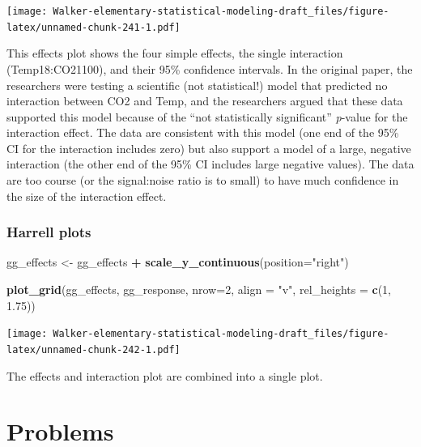 \documentclass[]{book}
\newenvironment{Shaded}{\begin{snugshade}}{\end{snugshade}}
\newcommand{\DataTypeTok}[1]{\textcolor[rgb]{0.13,0.29,0.53}{#1}}
\newcommand{\DecValTok}[1]{\textcolor[rgb]{0.00,0.00,0.81}{#1}}
\newcommand{\FloatTok}[1]{\textcolor[rgb]{0.00,0.00,0.81}{#1}}
\newcommand{\KeywordTok}[1]{\textcolor[rgb]{0.13,0.29,0.53}{\textbf{#1}}}
\newcommand{\NormalTok}[1]{#1}
\newcommand{\OperatorTok}[1]{\textcolor[rgb]{0.81,0.36,0.00}{\textbf{#1}}}
\newcommand{\StringTok}[1]{\textcolor[rgb]{0.31,0.60,0.02}{#1}}
\begin{document}
\texttt{[image: Walker-elementary-statistical-modeling-draft\_files/figure-latex/unnamed-chunk-241-1.pdf]}

This effects plot shows the four simple effects, the single interaction (Temp18:CO21100), and their 95\% confidence intervals. In the original paper, the researchers were testing a scientific (not statistical!) model that predicted no interaction between CO2 and Temp, and the researchers argued that these data supported this model because of the ``not statistically significant'' \emph{p}-value for the interaction effect. The data are consistent with this model (one end of the 95\% CI for the interaction includes zero) but also support a model of a large, negative interaction (the other end of the 95\% CI includes large negative values). The data are too course (or the signal:noise ratio is to small) to have much confidence in the size of the interaction effect.

\hypertarget{harrell-plots}{%
\subsubsection{Harrell plots}\label{harrell-plots}}

\begin{Shaded}
\begin{Highlighting}[]
\NormalTok{gg_effects <-}\StringTok{ }\NormalTok{gg_effects }\OperatorTok{+}\StringTok{ }\KeywordTok{scale_y_continuous}\NormalTok{(}\DataTypeTok{position=}\StringTok{"right"}\NormalTok{)}

\KeywordTok{plot_grid}\NormalTok{(gg_effects, gg_response, }\DataTypeTok{nrow=}\DecValTok{2}\NormalTok{, }
          \DataTypeTok{align =} \StringTok{"v"}\NormalTok{, }
          \DataTypeTok{rel_heights =} \KeywordTok{c}\NormalTok{(}\DecValTok{1}\NormalTok{, }\FloatTok{1.75}\NormalTok{))}
\end{Highlighting}
\end{Shaded}

\texttt{[image: Walker-elementary-statistical-modeling-draft\_files/figure-latex/unnamed-chunk-242-1.pdf]}

The effects and interaction plot are combined into a single plot.

\hypertarget{problems-1}{%
\section{Problems}\label{problems-1}}
\end{document}
